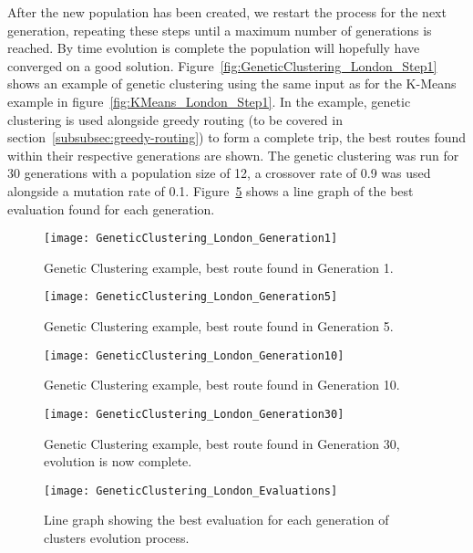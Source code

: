 \noindent
After the new population has been created, we restart the process for the next generation, repeating these steps
until a maximum number of generations is reached.
By time evolution is complete the population will hopefully have converged on a good solution.
Figure~\ref{fig:GeneticClustering_London_Step1} shows an example of genetic clustering using the same input as for the
K-Means example in figure~\ref{fig:KMeans_London_Step1}.
In the example, genetic clustering is used alongside greedy routing (to be covered in section~\ref{subsubsec:greedy-routing})
to form a complete trip, the best routes found within their respective generations are shown.
The genetic clustering was run for 30 generations with a population size of 12, a crossover rate of 0.9 was used
alongside a mutation rate of 0.1.
Figure~\ref{fig:GeneticClustering_London_Evaluations} shows a line graph of the best evaluation found for each
generation.
\begin{figure}[H]
    \ContinuedFloat*
    \centering
    \texttt{[image: GeneticClustering\_London\_Generation1]}
    \caption{Genetic Clustering example, best route found in Generation 1.}
    \label{fig:GeneticClustering_London_Generation1}
\end{figure}
\begin{figure}[H]
    \ContinuedFloat
    \centering
    \texttt{[image: GeneticClustering\_London\_Generation5]}
    \caption{Genetic Clustering example, best route found in Generation 5.}
    \label{fig:GeneticClustering_London_Generation2}
\end{figure}
\begin{figure}[H]
    \ContinuedFloat
    \centering
    \texttt{[image: GeneticClustering\_London\_Generation10]}
    \caption{Genetic Clustering example, best route found in Generation 10.}
    \label{fig:GeneticClustering_London_Generation10}
\end{figure}
\begin{figure}[H]
    \ContinuedFloat
    \centering
    \texttt{[image: GeneticClustering\_London\_Generation30]}
    \caption{Genetic Clustering example, best route found in Generation 30, evolution is now complete.}
    \label{fig:GeneticClustering_London_Generation30}
\end{figure}
\begin{figure}[H]
    \ContinuedFloat
    \centering
    \texttt{[image: GeneticClustering\_London\_Evaluations]}
    \caption{Line graph showing the best evaluation for each generation of clusters evolution process.}
    \label{fig:GeneticClustering_London_Evaluations}
\end{figure}
\noindent

